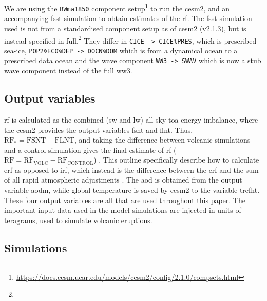 \documentclass{ametsocV5}
\newcommand{\iso}[1][i]{{#1}njected \ce{SO2}}
\begin{document}
We are using the \texttt{BWma1850} component
setup\footnote{\url{https://docs.cesm.ucar.edu/models/cesm2/config/2.1.0/compsets.html}}
to run the \ac{cesm2}, and an accompanying \ac{fsst}
simulation to obtain estimates of the \ac{rf}. The \ac{fsst} simulation used is not from
a standardised component setup as of \ac{cesm2} (v2.1.3), but is instead specified in
full.\footnote{\fssturl}
%
They differ in \texttt{CICE -> CICE\%PRES}, which is prescribed sea-ice,
\texttt{POP2\%ECO\%DEP -> DOCN\%DOM} which is from a dynamical ocean to a prescribed
data ocean and the wave component \texttt{WW3 -> SWAV} which is now a stub wave
component instead of the full \ac{ww3}.

\subsection{Output variables}

\Ac{rf} is calculated as the combined (\ac{sw} and \ac{lw}) all-sky \ac{toa} energy
imbalance, where the \ac{cesm2} provides the output variables \ac{fsnt} and \ac{flnt}.
Thus, \(\mathrm{RF_*}= \mathrm{FSNT} - \mathrm{FLNT}\), and taking the difference
between volcanic simulations and a control simulation gives the final estimate of
\ac{rf} (\(\mathrm{RF}=\mathrm{RF_{VOLC}}-\mathrm{RF_{CONTROL}}\)) \citep{marshall2020}.
This outline specifically describe how to calculate \ac{erf} as opposed to \ac{irf},
which instead is the difference between the \ac{erf} and the sum of all rapid
atmospheric adjustments \citep{marshall2020,smith2018}. The \ac{aod} is obtained from
the output variable \ac{aodm}, while global temperature is saved by \ac{cesm2} to the
variable \ac{trefht}. These four output variables are all that are used throughout this
paper. The important input data used in the model simulations are \iso{} in units of
teragrams, used to simulate volcanic eruptions.

\subsection{Simulations}
\end{document}
